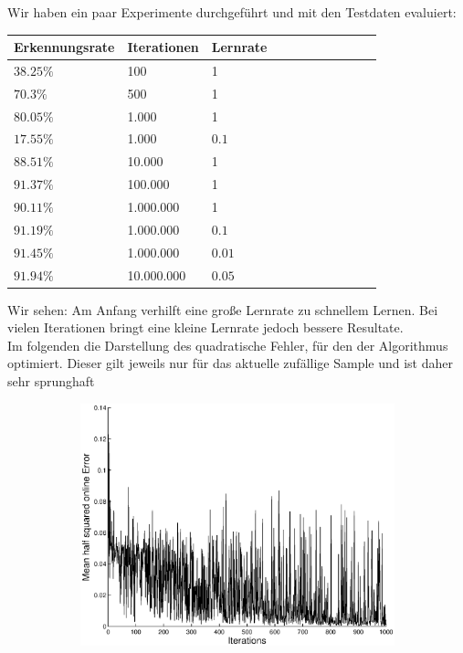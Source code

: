 \documentclass{article}
\begin{document}
  	Wir haben ein paar Experimente durchgeführt und mit den Testdaten evaluiert:
	\begin{table}[H]
	    \begin{tabular}{|l|l|l|l|l|l|l|l|l|l|l|}
	        \hline
         Erkennungsrate & Iterationen & Lernrate \\ \hline
         $ 38.25\% $ & 100 & 1\\
         $ 70.3\% $ & 500 & 1\\
         $ 80.05\% $ & 1.000 & 1\\
         $ 17.55\% $ & 1.000 & $ 0.1 $\\
         $ 88.51\% $ & 10.000 & 1\\
         $ 91.37\% $ & 100.000 & 1\\
         $ 90.11\% $ & 1.000.000 & 1\\
         $ 91.19\% $ & 1.000.000 & $ 0.1 $\\
         $ 91.45\% $ & 1.000.000 & $ 0.01 $\\
         $ 91.94\% $ & 10.000.000 & $ 0.05 $\\
	        \hline
	    \end{tabular}
	\end{table}
	Wir sehen: Am Anfang verhilft eine große Lernrate zu schnellem Lernen.
	Bei vielen Iterationen bringt eine kleine Lernrate jedoch bessere Resultate.\\
	
	Im folgenden die Darstellung des quadratische Fehler, für den der Algorithmus optimiert. Dieser gilt jeweils nur für das aktuelle zufällige Sample und ist daher sehr sprunghaft
	\begin{figure}[H]
	  \begin{subfigure}
	    \centering
	    \includegraphics[scale=0.75]{lr100_1K/task2-sq-mean-err-online.eps}
	  \end{subfigure}
	\end{figure}
	
\end{document}

